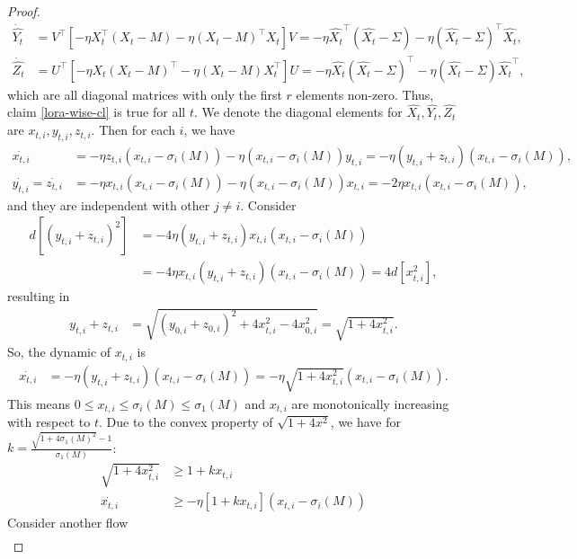 \begin{proof}
\begin{align}
        \dot{\hat{Y_t}}&=V^\top\left[-\eta X_t^\top (X_t-M)-\eta (X_t-M)^\top X_t\right]V= -\eta \hat{X_t}^\top (\hat{X_t}-\Sigma)-\eta (\hat{X_t}-\Sigma)^\top \hat{X_t},\\
        \dot{\hat{Z_t}}&=U^\top\left[-\eta X_t(X_t-M)^\top -\eta (X_t-M)X_t^\top\right]U= -\eta \hat{X_t}(\hat{X_t}-\Sigma)^\top -\eta (\hat{X_t}-\Sigma)\hat{X_t}^\top,
    \end{align}
    which are all diagonal matrices with only the first $r$ elements non-zero. Thus, claim \ref{lora-wise-cl} is true for all $t$. We denote the diagonal elements for $\hat{X_t},\hat{Y_t},\hat{Z_t}$ are $x_{t,i},y_{t,i},z_{t,i}$. Then for each $i$, we have
    \begin{align}
        \dot{x_{t,i}}&=-\eta z_{t,i}(x_{t,i}-\sigma_i(M))-\eta (x_{t,i}-\sigma_i(M))y_{t,i}=-\eta(y_{t,i}+z_{t,i})(x_{t,i}-\sigma_i(M)),\\
        \dot{y_{t,i}}=\dot{z_{t,i}}&= -\eta x_{t,i}(x_{t,i}-\sigma_i(M)) -\eta (x_{t,i}-\sigma_i(M))x_{t,i}=-2\eta x_{t,i}(x_{t,i}-\sigma_i(M)),
    \end{align}
    and they are independent with other $j\neq i$. 
    Consider
    \begin{align}
        d\left[(y_{t,i}+z_{t,i})^2\right]&=-4\eta(y_{t,i}+z_{t,i})x_{t,i}(x_{t,i}-\sigma_i(M))\\
        &=-4\eta x_{t,i}(y_{t,i}+z_{t,i})(x_{t,i}-\sigma_i(M))=4d\left[x_{t,i}^2\right],
    \end{align}
    resulting in
    \begin{align}
        y_{t,i}+z_{t,i}&=\sqrt{(y_{0,i}+z_{0,i})^2+4x_{t,i}^2-4x_{0,i}^2}=\sqrt{1+4x_{t,i}^2}. 
    \end{align}
    So, the dynamic of $x_{t,i}$ is
    \begin{align}
        \dot{x_{t,i}}&=-\eta(y_{t,i}+z_{t,i})(x_{t,i}-\sigma_i(M))=-\eta\sqrt{1+4x_{t,i}^2}(x_{t,i}-\sigma_i(M)).
    \end{align}
    This means $0\leq x_{t,i}\leq \sigma_i(M)\leq \sigma_1(M)$ and $x_{t,i}$ are monotonically increasing with respect to $t$. Due to the convex property of $\sqrt{1+4x^2}$, we have for $k=\frac{\sqrt{1+4\sigma_1(M)^2}-1}{\sigma_1(M)}$:
    \begin{align}
        \sqrt{1+4x_{t,i}^2}&\geq 1+kx_{t,i}\\
        \dot{x_{t,i}}&\geq -\eta\left[1+kx_{t,i}\right](x_{t,i}-\sigma_i(M))
    \end{align}
    Consider another flow 
    \begin{align}

\end{align}
\end{proof}
